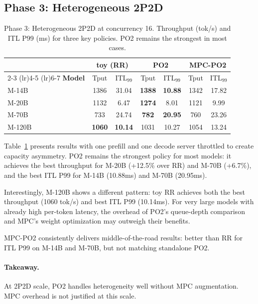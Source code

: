 \documentclass[runningheads]{llncs}
\begin{document}
\subsection{Phase 3: Heterogeneous 2P2D}
\label{sec:phase3}

\begin{table}[t]
\caption{Phase 3: Heterogeneous 2P2D at concurrency 16. Throughput (tok/s) and ITL P99 (ms) for three key policies. PO2 remains the strongest in most cases.}
\label{tab:phase3}
\centering
\small
\setlength{\tabcolsep}{3pt}
\begin{tabular}{l cc cc cc}
\toprule
& \multicolumn{2}{c}{\textbf{toy (RR)}} & \multicolumn{2}{c}{\textbf{PO2}} & \multicolumn{2}{c}{\textbf{MPC-PO2}} \\
\cmidrule(lr){2-3} \cmidrule(lr){4-5} \cmidrule(lr){6-7}
\textbf{Model} & Tput & ITL$_{99}$ & Tput & ITL$_{99}$ & Tput & ITL$_{99}$ \\
\midrule
M-14B  & 1386 & 31.04 & \textbf{1388} & \textbf{10.88} & 1342 & 17.82 \\
M-20B  & 1132 & 6.47  & \textbf{1274} & 8.01  & 1121 & 9.99 \\
M-70B  & 733  & 24.74 & \textbf{782}  & \textbf{20.95} & 760  & 23.26 \\
M-120B & \textbf{1060} & \textbf{10.14} & 1031 & 10.27 & 1054 & 13.24 \\
\bottomrule
\end{tabular}
\end{table}

Table~\ref{tab:phase3} presents results with one prefill and one decode server throttled to create capacity asymmetry. PO2 remains the strongest policy for most models: it achieves the best throughput for M-20B (+12.5\% over RR) and M-70B (+6.7\%), and the best ITL P99 for M-14B (10.88ms) and M-70B (20.95ms).

Interestingly, M-120B shows a different pattern: toy RR achieves both the best throughput (1060 tok/s) and best ITL P99 (10.14ms). For very large models with already high per-token latency, the overhead of PO2's queue-depth comparison and MPC's weight optimization may outweigh their benefits.

MPC-PO2 consistently delivers middle-of-the-road results: better than RR for ITL P99 on M-14B and M-70B, but not matching standalone PO2.

\paragraph{Takeaway.} At 2P2D scale, PO2 handles heterogeneity well without MPC augmentation. MPC overhead is not justified at this scale.
\end{document}
